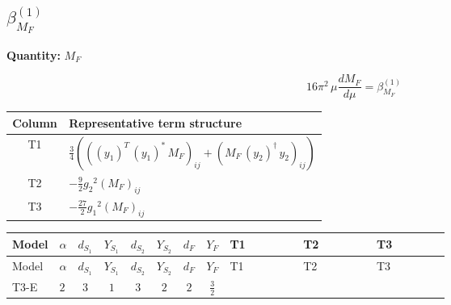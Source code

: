 \documentclass[8pt]{article}
\begin{document}
\begin{landscape}
\section*{$\beta_{M_F}^{(1)}$}
\noindent\textbf{Quantity: }$M_F$\par\smallskip
\[16\pi^2\,\mu\frac{d M_F}{d\mu}=\beta_{M_F}^{(1)}\]
\begin{center}
\begin{tabular}{@{}c >{\raggedright\arraybackslash}p{0.82\linewidth}@{}}
\toprule
Column & Representative term structure \\
\midrule
T1 & \(\displaystyle \frac{3}{4} (\left(\left({y_1}\right)^{T}\,\left({y_1}\right)^{*}\,{M_F}\right)_{ij}+\left({M_F}\,\left({y_2}\right)^{\dagger}\,{y_2}\right)_{ij})\) \\
\midrule
T2 & \(\displaystyle -\frac{9}{2} {g_2}^2 \left({M_F}\right)_{ij}\) \\
\midrule
T3 & \(\displaystyle -\frac{27}{2} {g_1}^2 \left({M_F}\right)_{ij}\) \\
\midrule
\bottomrule
\end{tabular}
\end{center}
\smallskip
\tiny
\begin{longtable}{@{}llcccccc >{\raggedright\arraybackslash}p{0.21\linewidth} >{\raggedright\arraybackslash}p{0.21\linewidth} >{\raggedright\arraybackslash}p{0.21\linewidth}@{}}
\toprule
Model & $\alpha$ & $d_{S_1}$ & $Y_{S_1}$ & $d_{S_2}$ & $Y_{S_2}$ & $d_F$ & $Y_F$ & T1 & T2 & T3 \\
\midrule
\endfirsthead
\toprule
Model & $\alpha$ & $d_{S_1}$ & $Y_{S_1}$ & $d_{S_2}$ & $Y_{S_2}$ & $d_F$ & $Y_F$ & T1 & T2 & T3 \\
\midrule
\endhead
T3-E & $2$ & $3$ & $1$ & $3$ & $2$ & $2$ & $\frac{3}{2}$ & \scriptsize\adjustbox{max width=\linewidth}{$\begin{gathered} \frac{3}{4} (\left(\left({y_1}\right)^{T}\,\left({y_1}\right)^{*}\,{M_F}\right)_{ij}+\left({M_F}\,\left({y_2}\right)^{\dagger}\,{y_2}\right)_{ij})\end{gathered}$} & \scriptsize\adjustbox{max width=\linewidth}{$\begin{gathered} -\frac{9}{2} {g_2}^2 \left({M_F}\right)_{ij}\end{gathered}$} & \scriptsize\adjustbox{max width=\linewidth}{$\begin{gathered} -\frac{27}{2} {g_1}^2 \left({M_F}\right)_{ij}\end{gathered}$} \\
\midrule
\bottomrule
\end{longtable}
\clearpage

\end{landscape}
\end{document}
